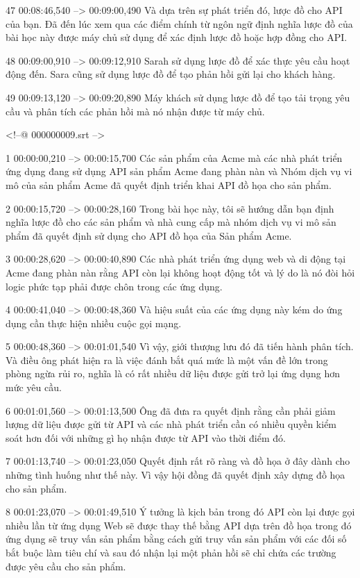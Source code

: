 47
00:08:46,540 --> 00:09:00,490
Và dựa trên sự phát triển đó, lược đồ cho API của bạn.  Đã đến lúc xem qua các điểm chính từ ngôn ngữ định nghĩa lược đồ của bài học này được máy chủ sử dụng để xác định lược đồ hoặc hợp đồng cho API.

48
00:09:00,910 --> 00:09:12,910
Sarah sử dụng lược đồ để xác thực yêu cầu hoạt động đến.  Sara cũng sử dụng lược đồ để tạo phản hồi gửi lại cho khách hàng.

49
00:09:13,120 --> 00:09:20,890
Máy khách sử dụng lược đồ để tạo tải trọng yêu cầu và phân tích các phản hồi mà nó nhận được từ máy chủ.

<!--@ 000000009.srt -->

1
00:00:00,210 --> 00:00:15,700
Các sản phẩm của Acme mà các nhà phát triển ứng dụng đang sử dụng API sản phẩm Acme đang phàn nàn và Nhóm dịch vụ vi mô của sản phẩm Acme đã quyết định triển khai API đồ họa cho sản phẩm.

2
00:00:15,720 --> 00:00:28,160
Trong bài học này, tôi sẽ hướng dẫn bạn định nghĩa lược đồ cho các sản phẩm và nhà cung cấp mà nhóm dịch vụ vi mô sản phẩm đã quyết định sử dụng cho API đồ họa của Sản phẩm Acme.

3
00:00:28,620 --> 00:00:40,890
Các nhà phát triển ứng dụng web và di động tại Acme đang phàn nàn rằng API còn lại không hoạt động tốt và lý do là nó đòi hỏi logic phức tạp phải được chôn trong các ứng dụng.

4
00:00:41,040 --> 00:00:48,360
Và hiệu suất của các ứng dụng này kém do ứng dụng cần thực hiện nhiều cuộc gọi mạng.

5
00:00:48,360 --> 00:01:01,540
Vì vậy, giới thượng lưu đó đã tiến hành phân tích.  Và điều ông phát hiện ra là việc đánh bắt quá mức là một vấn đề lớn trong phòng ngừa rủi ro, nghĩa là có rất nhiều dữ liệu được gửi trở lại ứng dụng hơn mức yêu cầu.

6
00:01:01,560 --> 00:01:13,500
Ông đã đưa ra quyết định rằng cần phải giảm lượng dữ liệu được gửi từ API và các nhà phát triển cần có nhiều quyền kiểm soát hơn đối với những gì họ nhận được từ API vào thời điểm đó.

7
00:01:13,740 --> 00:01:23,050
Quyết định rất rõ ràng và đồ họa ở đây dành cho những tình huống như thế này.  Vì vậy hội đồng đã quyết định xây dựng đồ họa cho sản phẩm.

8
00:01:23,070 --> 00:01:49,510
Ý tưởng là kịch bản trong đó API còn lại được gọi nhiều lần từ ứng dụng Web sẽ được thay thế bằng API dựa trên đồ họa trong đó ứng dụng sẽ truy vấn sản phẩm bằng cách gửi truy vấn sản phẩm với các đối số bắt buộc làm tiêu chí và sau đó nhận lại  một phản hồi sẽ chỉ chứa các trường được yêu cầu cho sản phẩm.

